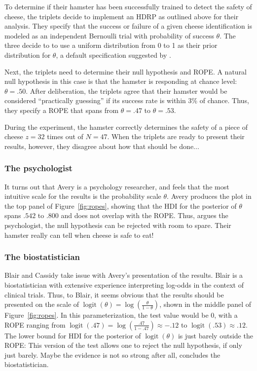 \documentclass[9pt,twocolumn,twoside]{cidlab-draft}\templatetype{cidlab-invited}
\newcommand{\hdr}{HDRP}
\DeclareMathOperator*{\logit}{logit}
\begin{document}
To determine if their hamster has been successfully trained to detect the safety of cheese, the triplets decide to implement an \hdr{} as outlined above for their analysis. They specify that the success or failure of a given cheese identification is modeled as an independent Bernoulli trial with probability of success $\theta$. The three decide to to use a uniform distribution from 0 to 1 as their prior distribution for $\theta$, a default specification suggested by . 

Next, the triplets need to determine their null hypothesis and ROPE. A natural null hypothesis in this case is that the hamster is responding at chance level: $\theta=.50$. After deliberation, the triplets agree that their hamster would be considered ``practically guessing'' if its success rate is within 3\% of chance. Thus, they specify a ROPE that spans from $\theta=.47$ to $\theta=.53$.

During the experiment, the hamster correctly determines the safety of a piece of cheese $z=32$ times out of $N=47$. When the triplets are ready to present their results, however, they disagree about how that should be done...

\subsubsection{The psychologist} It turns out that Avery is a psychology researcher, and feels that the most intuitive scale for the results is the probability scale $\theta$. Avery produces the plot in the top panel of Figure~\ref{fig:ropes}, showing that the HDI for the posterior of $\theta$ spans $.542$ to $.800$ and does not overlap with the ROPE.  Thus, argues the psychologist, the null hypothesis can be rejected with room to spare. Their hamster really can tell when cheese is safe to eat!

\subsubsection{The biostatistician} Blair and Cassidy take issue with Avery's presentation of the results. Blair is a biostatistician with extensive experience interpreting log-odds in the context of clinical trials. Thus, to Blair, it seems obvious that the results should be presented on the scale of $\logit(\theta)=\log\left(\frac{\theta}{1-\theta}\right)$, shown in the middle panel of Figure~\ref{fig:ropes}. In this parameterization, the test value would be 0, with a ROPE ranging from $\logit(.47)=\log\left(\frac{.47}{1-.47}\right)\approx-.12$ to $\logit(.53)\approx.12$. The lower bound for HDI for the posterior of $\logit(\theta)$ is just barely outside the ROPE: This version of the test allows one to reject the null hypothesis, if only just barely. Maybe the evidence is not so strong after all, concludes the biostatistician. 
\end{document}
